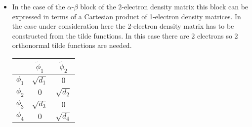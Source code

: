 \documentclass[aip,graphicx]{revtex4-1}
\begin{document}
\begin{itemize}
\begin{eqnarray}
\begin{matrix}
         0 & 0 & 0 & c_{34}^2
         \end{matrix}\right) \\
         &=&
         \left(\begin{matrix}
         d_{1} & 0 & 0 & 0 \\
         0 & d_{2} & 0 & 0 \\
         0 & 0 & d_{3} & 0 \\
         0 & 0 & 0 & d_{4} 
         \end{matrix}\right)
         \end{eqnarray}
         where also $d_1 = d_2$ and $d_3 = d_4$.
\item In the case of the $\alpha$-$\beta$ block of the 2-electron density matrix this block can be
         expressed in terms of a Cartesian product of 1-electron density matrices. In the case under
         consideration here the 2-electron density matrix has to be constructed from the tilde 
         functions. In this case there are 2 electrons so 2 orthonormal tilde functions are needed.
        
         \begin{tabular}{c|cc}
               & $\tilde{\phi}_1$ & $\tilde{\phi}_2$ \\
         \hline
         $\phi_1$ & $\sqrt{d_1}$ & $0$ \\
         $\phi_2$ & $0$               & $\sqrt{d_2}$ \\
         $\phi_3$ & $\sqrt{d_3}$ & $0$ \\
         $\phi_4$ & $0$               & $\sqrt{d_4}$
         \end{tabular}
         

\end{itemize}
\end{document}
